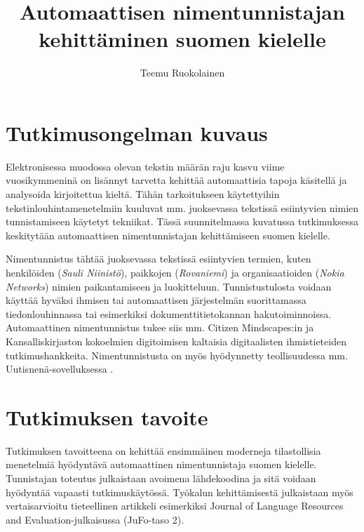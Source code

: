 \documentclass[12pt,a4paper,finnish,oneside]{article}
\begin{document}
\title{Automaattisen nimentunnistajan kehittäminen suomen kielelle}
\date{}
\author{Teemu Ruokolainen}


\maketitle


\section{Tutkimusongelman kuvaus}

Elektronisessa muodossa olevan tekstin määrän raju kasvu viime vuosikymmeninä on lisännyt tarvetta kehittää automaattisia tapoja käsitellä ja analysoida kirjoitettua kieltä. Tähän tarkoitukseen käytettyihin tekstinlouhintamenetelmiin kuuluvat mm. juoksevassa tekstissä esiintyvien nimien tunnistamiseen käytetyt tekniikat. Tässä suunnitelmassa kuvatussa tutkimuksessa keskitytään automaattisen nimentunnistajan kehittämiseen suomen kielelle. 


Nimentunnistus tähtää juoksevassa tekstissä esiintyvien termien, kuten henkilöiden (\textit{Sauli Niinistö}), paikkojen (\textit{Rovaniemi}) ja organisaatioiden (\textit{Nokia Networks}) nimien paikantamiseen ja luokitteluun. Tunnistustulosta voidaan käyttää hyväksi ihmisen tai automaattisen järjestelmän suorittamassa tiedonlouhinnassa tai esimerkiksi dokumenttitietokannan hakutoiminnoissa. Automaattinen nimentunnistus tukee siis mm. Citizen Mindscapes:in \cite{citizenmindscapes} ja Kansalliskirjaston kokoelmien digitoimisen \cite{} kaltaisia digitaalisten ihmistieteiden tutkimushankkeita. Nimentunnistusta on myös hyödynnetty teollisuudessa mm. Uutisnenä-sovelluksessa \cite{huovelin2013}.


\section{Tutkimuksen tavoite}

Tutkimuksen tavoitteena on kehittää ensimmäinen moderneja tilastollisia menetelmiä hyödyntävä automaattinen nimentunnistaja suomen kielelle. Tunnistajan toteutus julkaistaan avoimena lähdekoodina ja sitä voidaan hyödyntää vapaasti tutkimuskäytössä. Työkalun kehittämisestä julkaistaan myös vertaisarvioitu tieteellinen artikkeli esimerkiksi Journal of Language Resources and Evaluation-julkaisussa (JuFo-taso 2).
\end{document}
